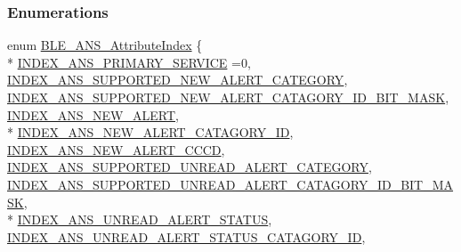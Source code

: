 \subsubsection*{Enumerations}
\begin{DoxyCompactItemize}
\item 
enum \hyperlink{group___b_l_e___a_n_s_ga80f34b5cfd2798b30f32bd666c2f82e8}{B\+L\+E\+\_\+\+A\+N\+S\+\_\+\+Attribute\+Index} \{ \\*
\hyperlink{group___b_l_e___a_n_s_gga80f34b5cfd2798b30f32bd666c2f82e8a2f5a0e00bf62844fd8a5b2c1a0c5b281}{I\+N\+D\+E\+X\+\_\+\+A\+N\+S\+\_\+\+P\+R\+I\+M\+A\+R\+Y\+\_\+\+S\+E\+R\+V\+I\+CE} =0, 
\hyperlink{group___b_l_e___a_n_s_gga80f34b5cfd2798b30f32bd666c2f82e8a8ed48018a098de74257f0530f883090e}{I\+N\+D\+E\+X\+\_\+\+A\+N\+S\+\_\+\+S\+U\+P\+P\+O\+R\+T\+E\+D\+\_\+\+N\+E\+W\+\_\+\+A\+L\+E\+R\+T\+\_\+\+C\+A\+T\+E\+G\+O\+RY}, 
\hyperlink{group___b_l_e___a_n_s_gga80f34b5cfd2798b30f32bd666c2f82e8a005f21e51ab0b78effc0888f097ff24e}{I\+N\+D\+E\+X\+\_\+\+A\+N\+S\+\_\+\+S\+U\+P\+P\+O\+R\+T\+E\+D\+\_\+\+N\+E\+W\+\_\+\+A\+L\+E\+R\+T\+\_\+\+C\+A\+T\+A\+G\+O\+R\+Y\+\_\+\+I\+D\+\_\+\+B\+I\+T\+\_\+\+M\+A\+SK}, 
\hyperlink{group___b_l_e___a_n_s_gga80f34b5cfd2798b30f32bd666c2f82e8a6d096fc1cda70df522ac597f624f30c3}{I\+N\+D\+E\+X\+\_\+\+A\+N\+S\+\_\+\+N\+E\+W\+\_\+\+A\+L\+E\+RT}, 
\\*
\hyperlink{group___b_l_e___a_n_s_gga80f34b5cfd2798b30f32bd666c2f82e8a23346c42b2d943109442f2a3fafaef53}{I\+N\+D\+E\+X\+\_\+\+A\+N\+S\+\_\+\+N\+E\+W\+\_\+\+A\+L\+E\+R\+T\+\_\+\+C\+A\+T\+A\+G\+O\+R\+Y\+\_\+\+ID}, 
\hyperlink{group___b_l_e___a_n_s_gga80f34b5cfd2798b30f32bd666c2f82e8a45db40dca6efc90660231ec8d7f1f97e}{I\+N\+D\+E\+X\+\_\+\+A\+N\+S\+\_\+\+N\+E\+W\+\_\+\+A\+L\+E\+R\+T\+\_\+\+C\+C\+CD}, 
\hyperlink{group___b_l_e___a_n_s_gga80f34b5cfd2798b30f32bd666c2f82e8aea35b8fa80e7ce3e74e6db211d42fbc5}{I\+N\+D\+E\+X\+\_\+\+A\+N\+S\+\_\+\+S\+U\+P\+P\+O\+R\+T\+E\+D\+\_\+\+U\+N\+R\+E\+A\+D\+\_\+\+A\+L\+E\+R\+T\+\_\+\+C\+A\+T\+E\+G\+O\+RY}, 
\hyperlink{group___b_l_e___a_n_s_gga80f34b5cfd2798b30f32bd666c2f82e8ae7045c42fb78abc0c2c51182e0361f8a}{I\+N\+D\+E\+X\+\_\+\+A\+N\+S\+\_\+\+S\+U\+P\+P\+O\+R\+T\+E\+D\+\_\+\+U\+N\+R\+E\+A\+D\+\_\+\+A\+L\+E\+R\+T\+\_\+\+C\+A\+T\+A\+G\+O\+R\+Y\+\_\+\+I\+D\+\_\+\+B\+I\+T\+\_\+\+M\+A\+SK}, 
\\*
\hyperlink{group___b_l_e___a_n_s_gga80f34b5cfd2798b30f32bd666c2f82e8a25639101b36619824f7cf4c8eadd85d0}{I\+N\+D\+E\+X\+\_\+\+A\+N\+S\+\_\+\+U\+N\+R\+E\+A\+D\+\_\+\+A\+L\+E\+R\+T\+\_\+\+S\+T\+A\+T\+US}, 
\hyperlink{group___b_l_e___a_n_s_gga80f34b5cfd2798b30f32bd666c2f82e8aa5592ce348bbd1e4373f31b1cbc4970d}{I\+N\+D\+E\+X\+\_\+\+A\+N\+S\+\_\+\+U\+N\+R\+E\+A\+D\+\_\+\+A\+L\+E\+R\+T\+\_\+\+S\+T\+A\+T\+U\+S\+\_\+\+C\+A\+T\+A\+G\+O\+R\+Y\+\_\+\+ID}, 

\end{DoxyCompactItemize}
